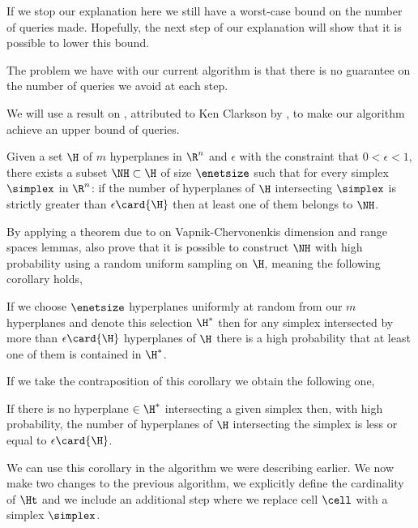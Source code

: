 
If we stop our explanation here we still have a worst-case 
bound on the number of queries made. Hopefully, the next step of our
explanation will show that it is possible to lower this bound.

The problem we have with our current algorithm is that there is no guarantee
on the number of queries we avoid at each step.

We will use a result on \enets, attributed to Ken Clarkson by
\citet{burgisser:1997}, to make our algorithm achieve an upper bound
of  queries.

\begin{theorem}[Clarkson]
Given a set $\H$ of $m$ hyperplanes in $\R^n$ and $\epsilon$ with the
constraint that $0 < \epsilon < 1$, there exists a subset $\NH \subset \H$ of
size $\enetsize$ such that for every simplex $\simplex$ in $\R^n$: if the
number of hyperplanes of $\H$ intersecting $\simplex$ is strictly greater than
$\epsilon \card{\H}$ then at least one of them belongs to $\NH$.
\end{theorem}

By applying a theorem due to \citet*{haussler:1987} on Vapnik-Chervonenkis
dimension and range spaces lemmas, \citet{burgisser:1997} also prove that it is possible to
construct $\NH$ with high probability using a random uniform sampling on $\H$,
meaning the following corollary holds,

\begin{corollary}
If we choose $\enetsize$ hyperplanes uniformly at
random from our $m$ hyperplanes and denote this selection $\H^{*}$ then for
any simplex intersected by more than $\epsilon \card{\H}$ hyperplanes of $\H$
there is a high probability that at least one of them is contained in $\H^{*}$.
\end{corollary}

If we take the contraposition of this corollary we obtain the following one,

\begin{corollary}
If there is no hyperplane $\in \H^{*}$ intersecting a given simplex then, with
high probability, the number of hyperplanes of $\H$ intersecting the simplex
is less or equal to $\epsilon \card{\H}$.
\end{corollary}

We can use this corollary in the algorithm we were describing earlier. We
now make two changes to the previous algorithm, we explicitly define the
cardinality of $\Ht$ and we include an additional step where we replace cell
$\cell$ with a simplex $\simplex$.

